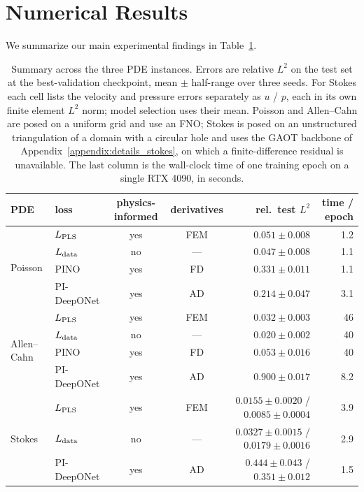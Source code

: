 \documentclass{article} %
\begin{document}
\section{Numerical Results}

We summarize our main experimental findings in Table~\ref{tab:summary}.

\begin{table}[t]
  \caption{Summary across the three PDE instances. Errors are relative $L^2$ on the test
  set at the best-validation checkpoint, mean $\pm$ half-range over three seeds. For Stokes each
  cell lists the velocity and pressure errors separately as $u$ / $p$, each in its own finite
  element $L^2$ norm; model selection uses their mean. Poisson and Allen--Cahn are posed on a
  uniform grid and use an FNO; Stokes is posed on an unstructured triangulation of a domain with
  a circular hole and uses the GAOT backbone of Appendix~\ref{appendix:details_stokes}, on which
  a finite-difference residual is unavailable. The last column is the wall-clock time of one
  training epoch on a single RTX 4090, in seconds.}
  \label{tab:summary}
  \centering
  \footnotesize
  \begin{tabular}{llccr r}
    \toprule
    PDE & loss & physics-informed & derivatives & rel.\ test $L^2$ & time / epoch \\
    \midrule
    \midrule
    \multirow{4}{*}{Poisson}
      & $L_\textup{PLS}$ & yes & FEM & $0.051 \pm 0.008$ & 1.2 \\
      & $L_\textup{data}$ & no & --- & $0.047 \pm 0.008$ & 1.1 \\
      & PINO & yes & FD & $0.331 \pm 0.011$ & 1.1 \\
      & PI-DeepONet & yes & AD & $0.214 \pm 0.047$ & 3.1 \\
    \midrule
    \multirow{4}{*}{Allen--Cahn}
      & $L_\textup{PLS}$ & yes & FEM & $0.032 \pm 0.003$ & 46 \\
      & $L_\textup{data}$ & no & --- & $0.020 \pm 0.002$ & 40 \\
      & PINO & yes & FD & $0.053 \pm 0.016$ & 40 \\
      & PI-DeepONet & yes & AD & $0.900 \pm 0.017$ & 8.2 \\
    \midrule
    \multirow{3}{*}{Stokes}
      & $L_\textup{PLS}$ & yes & FEM & $0.0155 \pm 0.0020$ / $0.0085 \pm 0.0004$ & 3.9 \\
      & $L_\textup{data}$ & no & --- & $0.0327 \pm 0.0015$ / $0.0179 \pm 0.0016$ & 2.9 \\
      & PI-DeepONet & yes & AD & $0.444 \pm 0.043$ / $0.351 \pm 0.012$ & 1.5 \\
    \bottomrule
  \end{tabular}
\end{table}
\end{document}
